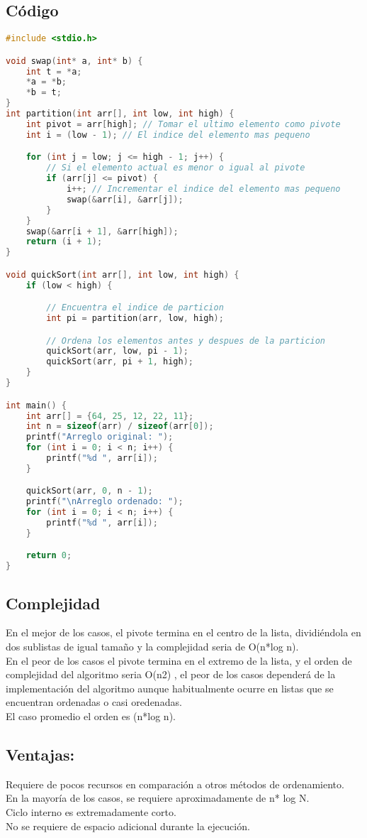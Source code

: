 \documentclass[]{article}
\begin{document}
\subsection{Código}
\begin{lstlisting}[language=C]
#include <stdio.h>

void swap(int* a, int* b) {
	int t = *a;
	*a = *b;
	*b = t;
}
int partition(int arr[], int low, int high) {
	int pivot = arr[high]; // Tomar el ultimo elemento como pivote
	int i = (low - 1); // El indice del elemento mas pequeno

	for (int j = low; j <= high - 1; j++) {
		// Si el elemento actual es menor o igual al pivote
		if (arr[j] <= pivot) {
			i++; // Incrementar el indice del elemento mas pequeno
			swap(&arr[i], &arr[j]);
		}
	}
	swap(&arr[i + 1], &arr[high]);
	return (i + 1);
}

void quickSort(int arr[], int low, int high) {
	if (low < high) {

		// Encuentra el indice de particion
		int pi = partition(arr, low, high);

		// Ordena los elementos antes y despues de la particion
		quickSort(arr, low, pi - 1);
		quickSort(arr, pi + 1, high);
	}
}

int main() {
	int arr[] = {64, 25, 12, 22, 11};
	int n = sizeof(arr) / sizeof(arr[0]);  
	printf("Arreglo original: ");
	for (int i = 0; i < n; i++) {
		printf("%d ", arr[i]);
	}

	quickSort(arr, 0, n - 1);
	printf("\nArreglo ordenado: ");
	for (int i = 0; i < n; i++) {
		printf("%d ", arr[i]);
	}

	return 0;
}

\end{lstlisting}
\subsection{Complejidad}
En el mejor de los casos, el pivote termina en el centro de la lista, dividiéndola en dos sublistas de igual tamaño y la complejidad seria de O(n*log n).\\
En el peor de los casos el pivote termina en el extremo de la lista, y el orden de complejidad del algoritmo seria O(n2) , el peor de los casos dependerá de la implementación del algoritmo aunque habitualmente ocurre en listas que se encuentran ordenadas o casi oredenadas.\\
El caso promedio el orden es (n*log n).\\

\subsection{Ventajas:}
Requiere de pocos recursos en comparación a otros métodos de ordenamiento.\\
En la mayoría de los casos, se requiere aproximadamente  de n* log N.\\
Ciclo interno es extremadamente corto.\\
No se requiere de espacio adicional durante la ejecución.\\
\end{document}
